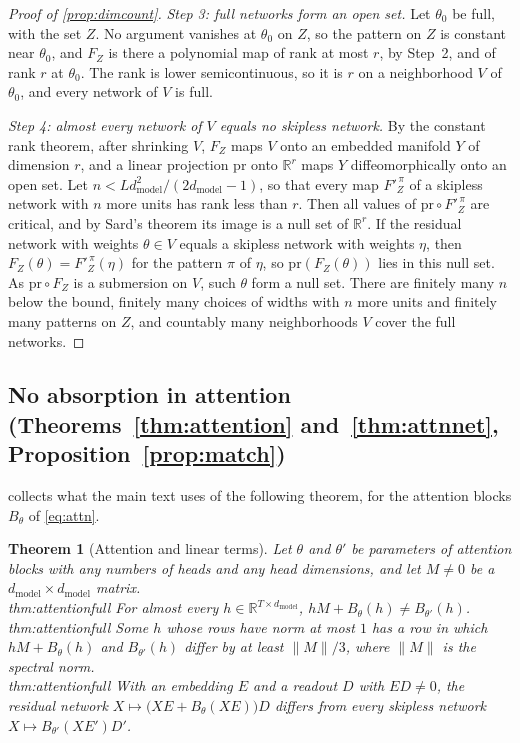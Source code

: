\documentclass[10pt]{article}
\newtheorem{theorem}{Theorem}[section]
\theoremstyle{definition}
\theoremstyle{remark}
\newcommand{\R}{\mathbb{R}}
\newcommand{\dm}{d_{\mathrm{model}}}
\newcommand{\norm}[1]{\lVert #1\rVert}
\newcommand{\ptlabel}[1]{\phantomsection\label{#1}}
\newcommand{\stpart}[3]{\ifx\relax#1\relax\else\ptlabel{#1:#2}\fi{\upshape\bfseries\boldmath(#2)\ifx\relax#3\relax\else\ #3.\fi}}
\begin{document}
\begin{proof}[Proof of \cref{prop:dimcount}]
\emph{Step 3: full networks form an open set.} Let $\theta_0$ be full, with the set $Z$. No argument vanishes at $\theta_0$ on $Z$, so the pattern on $Z$ is constant near $\theta_0$, and $F_Z$ is there a polynomial map of rank at most $r$, by Step~2, and of rank $r$ at $\theta_0$. The rank is lower semicontinuous, so it is $r$ on a neighborhood $V$ of $\theta_0$, and every network of $V$ is full.

\emph{Step 4: almost every network of $V$ equals no skipless network.} By the constant rank theorem, after shrinking $V$, $F_Z$ maps $V$ onto an embedded manifold $Y$ of dimension $r$, and a linear projection $\mathrm{pr}$ onto $\R^{r}$ maps $Y$ diffeomorphically onto an open set. Let $n < L\dm^2/(2\dm - 1)$, so that every map $F'^{\,\pi}_Z$ of a skipless network with $n$ more units has rank less than $r$. Then all values of $\mathrm{pr} \circ F'^{\,\pi}_Z$ are critical, and by Sard's theorem its image is a null set of $\R^{r}$. If the residual network with weights $\theta \in V$ equals a skipless network with weights $\eta$, then $F_Z(\theta) = F'^{\,\pi}_Z(\eta)$ for the pattern $\pi$ of $\eta$, so $\mathrm{pr}(F_Z(\theta))$ lies in this null set. As $\mathrm{pr} \circ F_Z$ is a submersion on $V$, such $\theta$ form a null set. There are finitely many $n$ below the bound, finitely many choices of widths with $n$ more units and finitely many patterns on $Z$, and countably many neighborhoods $V$ cover the full networks.
\end{proof}

\subsection{No absorption in attention\texorpdfstring{ (Theorems~\ref*{thm:attention} and~\ref*{thm:attnnet}, Proposition~\ref*{prop:match})}{}}\label{app:attention}

 collects what the main text uses of the following theorem, for the attention blocks $B_\theta$ of \cref{eq:attn}.

\begin{theorem}[Attention and linear terms]\label{thm:attentionfull}
Let $\theta$ and $\theta'$ be parameters of attention blocks with any numbers of heads and any head dimensions, and let $M \neq 0$ be a $\dm\times\dm$ matrix.\\
\stpart{thm:attentionfull}{i}{} For almost every $h \in \R^{T\times\dm}$, $hM + B_\theta(h) \neq B_{\theta'}(h)$.\\
\stpart{thm:attentionfull}{ii}{} Some $h$ whose rows have norm at most $1$ has a row in which $hM + B_\theta(h)$ and $B_{\theta'}(h)$ differ by at least $\norm{M}/3$, where $\norm{M}$ is the spectral norm.\\
\stpart{thm:attentionfull}{iii}{} With an embedding $E$ and a readout $D$ with $ED \neq 0$, the residual network $X \mapsto \big(XE + B_\theta(XE)\big)D$ differs from every skipless network $X \mapsto B_{\theta'}(XE')D'$.
\end{theorem}
\end{document}
